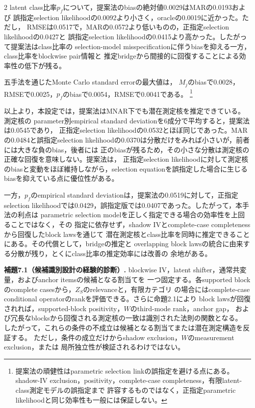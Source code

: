 \documentclass[a4paper,10pt]{article}
\begin{document}
\begin{multicols}{2}
latent class比率$p_f$について，提案法のbiasの絶対値0.0029はMARの0.0193および
誤指定selection likelihoodの0.0092より小さく，oracleの0.0019に近かった。ただし，
RMSEは0.0517で，MARの0.0572より低いものの，正指定selection likelihoodの0.0427と
誤指定selection likelihoodの0.0415より高かった。したがって提案法はclass比率の
selection-model misspecificationに伴うbiasを抑える一方，class比率をblockwise pair情報と
推定bridgeから間接的に回復することによる効率性の低下が残る。

五手法を通じたMonte Carlo standard errorの最大値は，
$M_j$のbiasで0.0028，RMSEで0.0025，$p_f$のbiasで0.0054，RMSEで0.0041である。%
\footnote{提案法の頑健性はparametric selection linkの誤指定を避ける点にある。
shadow-IV exclusion，positivity，complete-case completeness，有限latent-class測定モデルの誤指定まで
許容するものではなく，正指定parametric likelihoodと同じ効率性も一般には保証しない。}

以上より，本設定では，提案法はMNAR下でも潜在測定核を推定できている。測定核の
parameter別empirical standard deviationを6成分で平均すると，提案法は0.0545であり，
正指定selection likelihoodの0.0532とほぼ同じであった。MARの0.0484と誤指定selection
likelihoodの0.0370は分散だけをみれば小さいが，前者には大きな負のbias，後者には
正のbiasが残るため，その小さな分散は測定核の正確な回復を意味しない。提案法は，
正指定selection likelihoodに対して測定核のbiasと変動をほぼ維持しながら，selection
equationを誤指定した場合に生じるbiasを抑えている点に優位性がある。

一方，$p_f$のempirical standard deviationは，提案法の0.0519に対して，正指定selection
likelihoodでは0.0429，誤指定版では0.0407であった。したがって，本手法の利点は
parametric selection modelを正しく指定できる場合の効率性を上回ることではなく，その
指定に依存せず，shadow IVとcomplete-case completenessから回復したblock lawsを通じて
潜在測定核とclass比率を同時に推定できることにある。その代償として，bridgeの推定と
overlapping block lawsの統合に由来する分散が残り，とくにclass比率の推定効率には改善の
余地がある。

\noindent\textbf{補題7.1（候補識別設計の経験的診断）.}
blockwise IV，latent shifter，通常共変量，およびanchor itemsの候補となる割当てを
一つ固定する。各supported blockのcomplete casesから，$Z_S$のrelevanceと，有限カテゴリ
の場合にはcomplete-case conditional operatorのrankを評価できる。さらに命題2.1により
block lawsが回復されれば，supported-block positivity，$W$のthird-mode rank，anchor gap，
および冗長なblocksから回復される測定核の一致は識別された法則の関数となる。
したがって，これらの条件の不成立は候補となる割当てまたは潜在測定構造を反証する。
ただし，条件の成立だけからshadow exclusion，$W$のmeasurement exclusion，または
局所独立性が検証されるわけではない。


\end{multicols}
\end{document}
